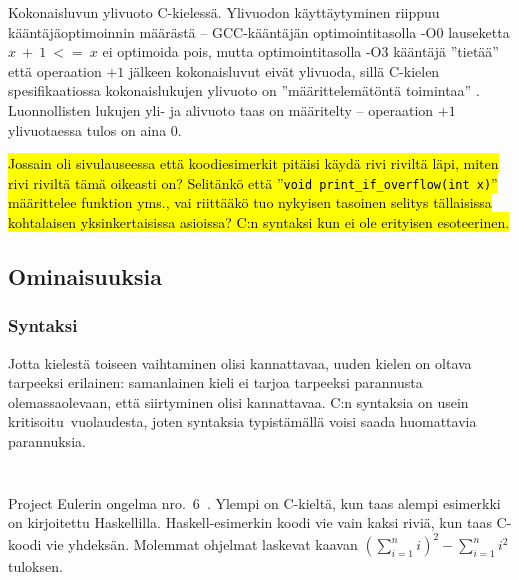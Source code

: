 \begin{listing}[ht!]
    \inputminted{C}{c-overflow.c}
    \inputminted{text}{c-overflow-output.txt}

    \caption{Kokonaisluvun ylivuoto C-kielessä. Ylivuodon käyttäytyminen
    riippuu kääntäjäoptimoinnin määrästä -- GCC-kääntäjän optimointitasolla -O0
    lauseketta $x~+~1~<=~x$ ei optimoida pois, mutta optimointitasolla -O3
    kääntäjä ''tietää'' että operaation $+1$ jälkeen kokonaisluvut eivät
    ylivuoda, sillä C-kielen spesifikaatiossa kokonaislukujen ylivuoto on
    ''määrittelemätöntä toimintaa'' .
    Luonnollisten lukujen yli- ja alivuoto taas on määritelty -- operaation
    $+1$ ylivuotaessa tulos on aina $0$.}
\end{listing}

\FloatBarrier

\hl{ Jossain oli sivulauseessa että koodiesimerkit pitäisi käydä rivi riviltä
läpi, miten rivi riviltä tämä oikeasti on? Selitänkö että ''\texttt{void
print\_if\_overflow(int x)}'' määrittelee funktion yms., vai riittääkö tuo
nykyisen tasoinen selitys tällaisissa kohtalaisen yksinkertaisissa asioissa?
C:n syntaksi kun ei ole erityisen esoteerinen.}

\FloatBarrier

\subsection{Ominaisuuksia}

\subsubsection{Syntaksi}

Jotta kielestä toiseen vaihtaminen olisi kannattavaa, uuden kielen on oltava
tarpeeksi erilainen: samanlainen kieli ei tarjoa tarpeeksi parannusta
olemassaolevaan, että siirtyminen olisi kannattavaa. C:n syntaksia on usein
kritisoitu\citationneeded~vuolaudesta, joten syntaksia typistämällä voisi saada
huomattavia parannuksia.

\begin{listing}[ht!]
    \inputminted{C}{squaresum.c}
    \inputminted{Haskell}{squaresum.hs}
    \caption{Project Eulerin ongelma nro.\ 6~\citep{euler}. Ylempi on
    C-kieltä, kun taas alempi esimerkki on kirjoitettu Haskellilla.
    Haskell-esimerkin koodi vie vain kaksi riviä, kun taas C-koodi vie
    yhdeksän. Molemmat ohjelmat laskevat kaavan
    $(\sum\limits_{i=1}^n i)^2 - \sum\limits_{i=1}^n i^2$ tuloksen.
    }
    \label{fig:strcmp}
\end{listing}

